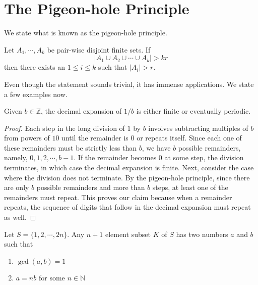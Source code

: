 \section{The Pigeon-hole Principle}
We state what is known as the pigeon-hole principle.
\begin{theorem}
Let $A_{1},\cdots,A_{k}$ be pair-wise disjoint finite sets. If \[|A_{1}\cup A_{2}\cup \cdots \cup A_{k}|>kr\] then there exists an $1\leq i\leq k$ such that $|A_{i}|>r$.
\end{theorem}
Even though the statement sounds trivial, it has immense applications. We state a few examples now. 
\begin{claim}
Given $b\in \mathbb{Z}$, the decimal expansion of $1/b$ is either finite or eventually periodic.
\end{claim}
\begin{proof}
Each step in the long division of $1$ by $b$ involves subtracting multiples of $b$ from powers of $10$ until the remainder is $0$ or repeats itself. Since each one of these remainders must be strictly less than $b$, we have $b$ possible remainders, namely, $0, 1, 2, \cdots, b-1$. If the remainder becomes $0$ at some step, the division terminates, in which case the decimal expansion is finite. Next, consider the case where the division does not terminate. By the pigeon-hole principle, since there are only $b$ possible remainders and more than $b$ steps, at least one of the remainders must repeat. This proves our claim because when a remainder repeats, the sequence of digits that follow in the decimal expansion must repeat as well.
\end{proof}
\begin{claim}
Let $S=\{1,2,\cdots,2n\}$. Any $n+1$ element subset $K$ of $S$ has two numbers $a$ and $b$ such that
\begin{enumerate}
	\item $\gcd(a,b) = 1$
	\item $a=nb$ for some $n\in\mathbb{N}$
\end{enumerate}
\end{claim}
